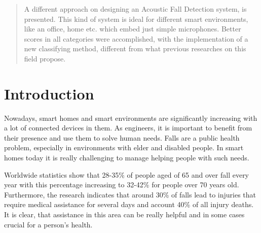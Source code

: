 \documentclass{article}
\begin{document}
 


\begin{abstract} 
A different approach on designing an Acoustic Fall Detection system, is presented. This kind of system is ideal for different smart environments, like an office, home etc. which embed just simple microphones. Better scores in all categories were accomplished, with the implementation of a new classifying method, different from what previous researches on this field propose.
\end{abstract} 

\section{Introduction}
\label{introduction}

Nowadays, smart homes and smart environments are significantly increasing with a lot of connected devices in them. As engineers, it is important to benefit from their presence and use them to solve human needs. Falls are a public health problem, especially in environments with elder and disabled people. In smart homes today it is really challenging to manage helping people with such needs. 

Worldwide statistics  show that 28-35\% of people aged of 65 and over fall every year with this percentage increasing to 32-42\% for people over 70 years old. Furthermore, the research indicates that around 30\% of falls lead to injuries that require medical assistance for several days and account 40\% of all injury deaths. It is clear, that assistance in this area can be really helpful and in some cases crucial for a person's health.
\end{document}
